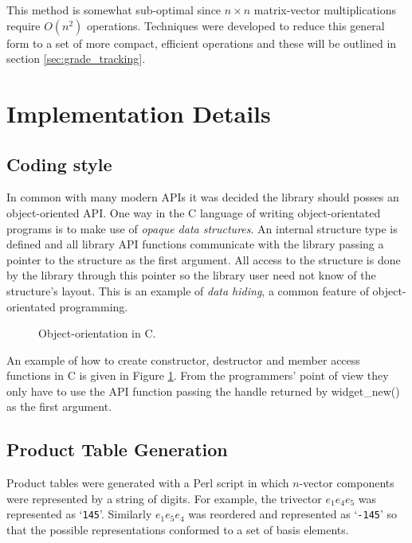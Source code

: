 This method is somewhat sub-optimal since $n \times n$ matrix-vector
multiplications require $O(n^2)$ operations. Techniques were developed to
reduce this general form to a set of more compact, efficient operations and
these will be outlined in section \ref{sec:grade_tracking}.


\section{Implementation Details}

\subsection{Coding style}

In common with many modern APIs it was decided the library should posses
an object-oriented API. One
way in the C language of writing object-orientated programs is to make
use of \emph{opaque data structures}. An internal structure type is defined
and all library API functions communicate with the library passing a 
pointer to the structure as the first argument. All access to the
structure is done by the library through this pointer so the library
user need not know of the structure's layout. This is an example
of \emph{data hiding}, a common feature of object-orientated programming.

\begin{figure}
\centering
\begin{minipage}{8cm}

\end{minipage}
\caption{Object-orientation in C.\label{fig:oopc}}
\end{figure}

An example of how to create constructor, destructor and member access 
functions in C is given in Figure \ref{fig:oopc}. From the programmers'
point of view they only have to use the API function passing the handle returned
by \textsf{widget\_new()} as the first argument.

\subsection{Product Table Generation}

Product tables were generated with a Perl
script in which $n$-vector components were represented
by a string of digits. For example, the trivector $e_1e_4e_5$ was represented as
`{\tt 145}'. Similarly $e_1e_5e_4$ was reordered and
represented as `{\tt -145}' so that the 
possible representations conformed to a set of basis elements.

